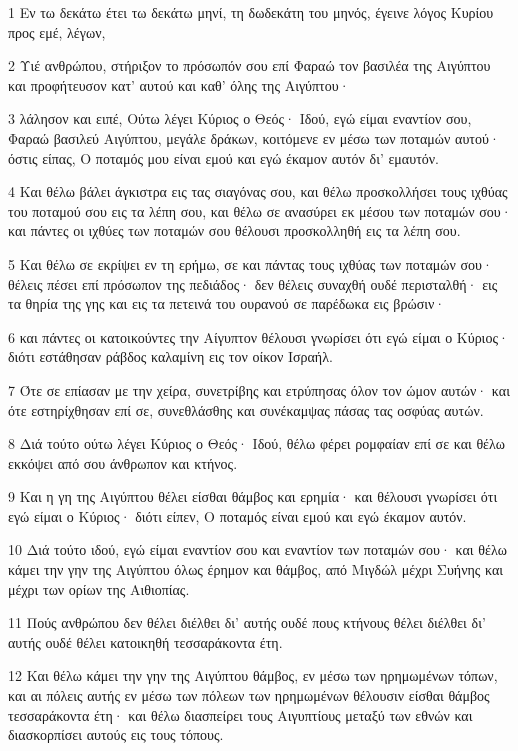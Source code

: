 \par 1 Εν τω δεκάτω έτει τω δεκάτω μηνί, τη δωδεκάτη του μηνός, έγεινε λόγος Κυρίου προς εμέ, λέγων,
\par 2 Υιέ ανθρώπου, στήριξον το πρόσωπόν σου επί Φαραώ τον βασιλέα της Αιγύπτου και προφήτευσον κατ' αυτού και καθ' όλης της Αιγύπτου·
\par 3 λάλησον και ειπέ, Ούτω λέγει Κύριος ο Θεός· Ιδού, εγώ είμαι εναντίον σου, Φαραώ βασιλεύ Αιγύπτου, μεγάλε δράκων, κοιτόμενε εν μέσω των ποταμών αυτού· όστις είπας, Ο ποταμός μου είναι εμού και εγώ έκαμον αυτόν δι' εμαυτόν.
\par 4 Και θέλω βάλει άγκιστρα εις τας σιαγόνας σου, και θέλω προσκολλήσει τους ιχθύας του ποταμού σου εις τα λέπη σου, και θέλω σε ανασύρει εκ μέσου των ποταμών σου· και πάντες οι ιχθύες των ποταμών σου θέλουσι προσκολληθή εις τα λέπη σου.
\par 5 Και θέλω σε εκρίψει εν τη ερήμω, σε και πάντας τους ιχθύας των ποταμών σου· θέλεις πέσει επί πρόσωπον της πεδιάδος· δεν θέλεις συναχθή ουδέ περισταλθή· εις τα θηρία της γης και εις τα πετεινά του ουρανού σε παρέδωκα εις βρώσιν·
\par 6 και πάντες οι κατοικούντες την Αίγυπτον θέλουσι γνωρίσει ότι εγώ είμαι ο Κύριος· διότι εστάθησαν ράβδος καλαμίνη εις τον οίκον Ισραήλ.
\par 7 Ότε σε επίασαν με την χείρα, συνετρίβης και ετρύπησας όλον τον ώμον αυτών· και ότε εστηρίχθησαν επί σε, συνεθλάσθης και συνέκαμψας πάσας τας οσφύας αυτών.
\par 8 Διά τούτο ούτω λέγει Κύριος ο Θεός· Ιδού, θέλω φέρει ρομφαίαν επί σε και θέλω εκκόψει από σου άνθρωπον και κτήνος.
\par 9 Και η γη της Αιγύπτου θέλει είσθαι θάμβος και ερημία· και θέλουσι γνωρίσει ότι εγώ είμαι ο Κύριος· διότι είπεν, Ο ποταμός είναι εμού και εγώ έκαμον αυτόν.
\par 10 Διά τούτο ιδού, εγώ είμαι εναντίον σου και εναντίον των ποταμών σου· και θέλω κάμει την γην της Αιγύπτου όλως έρημον και θάμβος, από Μιγδώλ μέχρι Συήνης και μέχρι των ορίων της Αιθιοπίας.
\par 11 Πούς ανθρώπου δεν θέλει διέλθει δι' αυτής ουδέ πους κτήνους θέλει διέλθει δι' αυτής ουδέ θέλει κατοικηθή τεσσαράκοντα έτη.
\par 12 Και θέλω κάμει την γην της Αιγύπτου θάμβος, εν μέσω των ηρημωμένων τόπων, και αι πόλεις αυτής εν μέσω των πόλεων των ηρημωμένων θέλουσιν είσθαι θάμβος τεσσαράκοντα έτη· και θέλω διασπείρει τους Αιγυπτίους μεταξύ των εθνών και διασκορπίσει αυτούς εις τους τόπους.
